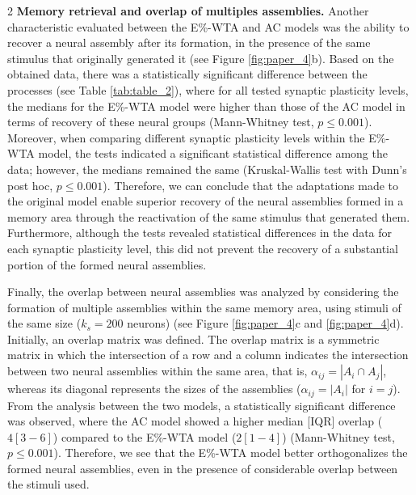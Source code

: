 \documentclass[a4paper, 10pt]{article}
\begin{document}
\begin{multicols}{2}
\noindent\textbf{Memory retrieval and overlap of multiples assemblies.} Another characteristic evaluated between the E\%-WTA and AC models was the ability to recover a neural assembly after its formation, in the presence of the same stimulus that originally generated it (see Figure \ref{fig:paper_4}b). Based on the obtained data, there was a statistically significant difference between the processes (see Table \ref{tab:table_2}), where for all tested synaptic plasticity levels, the medians for the E\%-WTA model were higher than those of the AC model in terms of recovery of these neural groups (Mann-Whitney test, $p \leq 0.001$). Moreover, when comparing different synaptic plasticity levels within the E\%-WTA model, the tests indicated a significant statistical difference among the data; however, the medians remained the same (Kruskal-Wallis test with Dunn’s post hoc, $p \leq 0.001$). Therefore, we can conclude that the adaptations made to the original model enable superior recovery of the neural assemblies formed in a memory area through the reactivation of the same stimulus that generated them. Furthermore, although the tests revealed statistical differences in the data for each synaptic plasticity level, this did not prevent the recovery of a substantial portion of the formed neural assemblies. 

Finally, the overlap between neural assemblies was analyzed by considering the formation of multiple assemblies within the same memory area, using stimuli of the same size ($k_s = 200$ neurons) (see Figure \ref{fig:paper_4}c and \ref{fig:paper_4}d). Initially, an overlap matrix was defined. The overlap matrix is a symmetric matrix in which the intersection of a row and a column indicates the intersection between two neural assemblies within the same area, that is, $\alpha_{ij} = |A_{i} \cap A_{j}|$, whereas its diagonal represents the sizes of the assemblies ($\alpha_{ij} = |A_{i}|$ for $i = j$). From the analysis between the two models, a statistically significant difference was observed, where the AC model showed a higher median [IQR] overlap ($4\left[3-6\right]$) compared to the E\%-WTA model ($2\left[1-4\right]$) (Mann-Whitney test, $p \leq 0.001$). Therefore, we see that the E\%-WTA model better orthogonalizes the formed neural assemblies, even in the presence of considerable overlap between the stimuli used.
\end{multicols}
\end{document}
